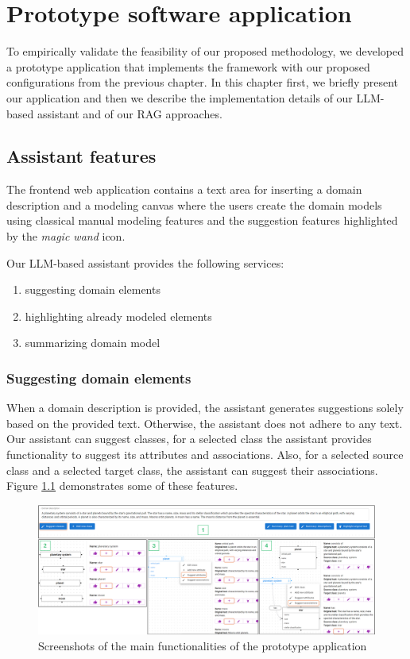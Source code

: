 \chapter{Prototype software application}
\label{chap:protype_software_application}

To empirically validate the feasibility of our proposed methodology, we developed a prototype application that implements the framework with our proposed configurations from the previous chapter. In this chapter first, we briefly present our application and then we describe the implementation details of our LLM-based assistant and of our RAG approaches.


\section{Assistant features}

The frontend web application contains a text area for inserting a domain description and a modeling canvas where the users create the domain models using classical manual modeling features and the suggestion features highlighted by the \textit{magic wand} icon.

Our LLM-based assistant provides the following services:

\begin{enumerate}
\item suggesting domain elements
\item highlighting already modeled elements
\item summarizing domain model
\end{enumerate}


\subsection{Suggesting domain elements}

When a domain description is provided, the assistant generates suggestions solely based on the provided text. Otherwise, the assistant does not adhere to any text. Our assistant can suggest classes, for a selected class the assistant provides functionality to suggest its attributes and associations. Also, for a selected source class and a selected target class, the assistant can suggest their associations. Figure \ref{fig:assistant-features} demonstrates some of these features.

\begin{figure}[!h]
    \centering
    \includegraphics[scale=0.22]{img/assistant-features.png}
    \caption{\centering Screenshots of the main functionalities of the prototype application}
    \label{fig:assistant-features}
\end{figure}


